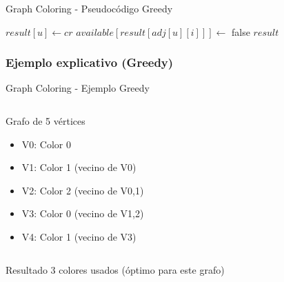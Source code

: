\documentclass[aspectratio=169]{beamer}
\begin{document}
\begin{frame}[fragile]{Graph Coloring - Pseudocódigo Greedy}
    
    \begin{algorithmic}[1]
        \State $result[u] \leftarrow cr$ 
                \State $available[result[adj[u][i]]] \leftarrow$ false
            \EndIf
        \EndFor
    \EndFor
    \Return $result$
    \end{algorithmic}
    \normalsize
\end{frame}






\subsubsection{Ejemplo explicativo (Greedy)}
\begin{frame}{Graph Coloring - Ejemplo Greedy}
\begin{columns}
\begin{column}{0.5\textwidth}
\begin{exampleblock}{Grafo de 5 vértices}
\begin{itemize}
\item V0: Color 0
\item V1: Color 1 (vecino de V0)
\item V2: Color 2 (vecino de V0,1)
\item V3: Color 0 (vecino de V1,2)
\item V4: Color 1 (vecino de V3)
\end{itemize}
\end{exampleblock}
\end{column}
\begin{column}{0.5\textwidth}
\end{column}
\end{columns}

\begin{block}{Resultado}
3 colores usados (óptimo para este grafo)
\end{block}
\end{frame}
\end{document}
